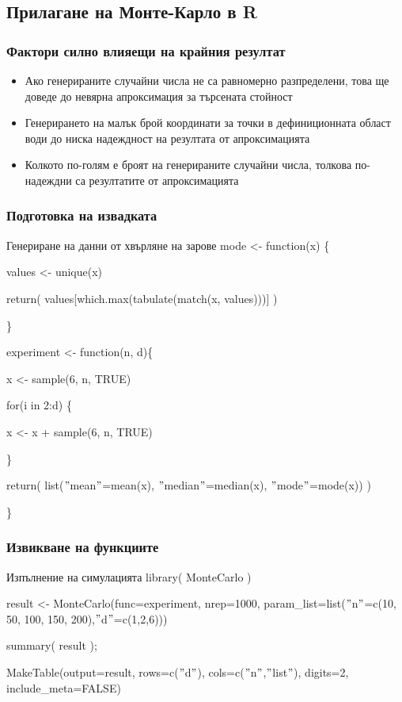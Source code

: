 \documentclass{beamer}
\begin{document}
\subsection{Прилагане на Монте-Карло в R}

\begin{frame}
\frametitle{Фактори силно влияещи на крайния резултат}
\begin{itemize}
	\item Ако генерираните случайни числа не са равномерно разпределени, това ще доведе до невярна апроксимация за търсената стойност

	\item Генерирането на малък брой координати за точки в дефиниционната област води до ниска надеждност на резултата от апроксимацията

	\item Колкото по-голям е броят на генерираните случайни числа, толкова по-надеждни са резултатите от апроксимацията
\end{itemize}
\end{frame}

\begin{frame}
\frametitle{Подготовка на извадката}
\begin{block}{Генериране на данни от хвърляне на зарове}
mode <- function(x) \{

	values <- unique(x)

	return( values[which.max(tabulate(match(x, values)))] )

\}

experiment <- function(n, d)\{

	x <- sample(6, n, TRUE)

	for(i in 2:d) \{
	
		x <- x + sample(6, n, TRUE)
		
	\}

	return( list($"$mean$"$=mean(x), $"$median$"$=median(x), $"$mode$"$=mode(x)) )

\}
\end{block}
\end{frame}

\begin{frame}
\frametitle{Извикване на функциите}
\begin{block}{Изпълнение на симулацията}
library( MonteCarlo )

result <- MonteCarlo(func=experiment, nrep=1000, param\_list=list($"$n$"$=c(10, 50, 100, 150, 200),$"$d$"$=c(1,2,6)))

summary( result );

MakeTable(output=result, rows=c($"$d$"$), cols=c($"$n$"$,$"$list$"$), digits=2, include\_meta=FALSE)
\end{block}
\end{frame}
\end{document}
